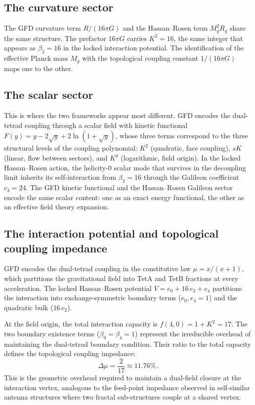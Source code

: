 \documentclass[twocolumn,showpacs,preprintnumbers,amsmath,amssymb,prd]{revtex4-2}
\begin{document}
\subsection{The curvature sector}

The GFD curvature term $R/(16\pi G)$ and the Hassan--Rosen term $M_g^2 R_g$ share the same structure. The prefactor $16\pi G$ carries $K^2 = 16$, the same integer that appears as $\beta_2 = 16$ in the locked interaction potential. The identification of the effective Planck mass $M_g$ with the topological coupling constant $1/(16\pi G)$ maps one to the other.

\subsection{The scalar sector}

This is where the two frameworks appear most different. GFD encodes the dual-tetrad coupling through a scalar field with kinetic functional $F(y) = y - 2\sqrt{y} + 2\ln(1+\sqrt{y})$, whose three terms correspond to the three structural levels of the coupling polynomial: $K^2$ (quadratic, face coupling), $sK$ (linear, flow between sectors), and $K^0$ (logarithmic, field origin). In the locked Hassan--Rosen action, the helicity-0 scalar mode that survives in the decoupling limit inherits its self-interaction from $\beta_2 = 16$ through the Galileon coefficient $c_3 = 24$. The GFD kinetic functional and the Hassan--Rosen Galileon sector encode the same scalar content: one as an exact energy functional, the other as an effective field theory expansion.

\subsection{The interaction potential and topological coupling impedance}

GFD encodes the dual-tetrad coupling in the constitutive law $\mu = x/(x+1)$, which partitions the gravitational field into TetA and TetB fractions at every acceleration. The locked Hassan--Rosen potential $V = e_0 + 16\,e_2 + e_4$ partitions the interaction into exchange-symmetric boundary terms ($e_0, e_4 = 1$) and the quadratic bulk ($16\,e_2$).

At the field origin, the total interaction capacity is $f(4,0) = 1 + K^2 = 17$. The two boundary existence terms ($\beta_0 = \beta_4 = 1$) represent the irreducible overhead of maintaining the dual-tetrad boundary condition. Their ratio to the total capacity defines the topological coupling impedance:
\begin{equation}
\label{eq:impedance}
\Delta\mu = \frac{2}{17} \approx 11.76\%\,.
\end{equation}
This is the geometric overhead required to maintain a dual-field closure at the interaction vertex, analogous to the feed-point impedance observed in self-similar antenna structures where two fractal sub-structures couple at a shared vertex.
\end{document}
